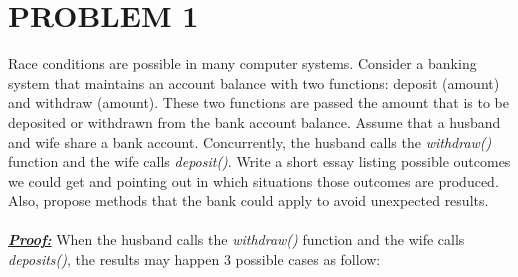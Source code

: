 \documentclass[13pt,a4paper]{article}
\begin{document}
	
	\newpage
	
	
	\section{PROBLEM 1}
		Race conditions are possible in many computer systems. Consider a banking system that maintains an account balance with two functions: deposit (amount) and withdraw (amount). These two functions are passed the amount that is to be deposited or withdrawn from the bank account balance. Assume that a husband and wife share a bank account. Concurrently, the husband calls the \textit{withdraw()} function and the wife calls \textit{deposit()}. Write a short essay listing possible outcomes we could get and pointing out in which situations those outcomes are produced. Also, propose methods that the bank could apply to avoid unexpected results. \\
		\\
		\textit{\underline{\textbf{Proof:}}}
		\newline
		\hspace{1 cm} When the husband calls the \textit{withdraw()} function and the wife calls \textit{deposits()}, the results may happen 3 possible cases as follow: 
\end{document}
